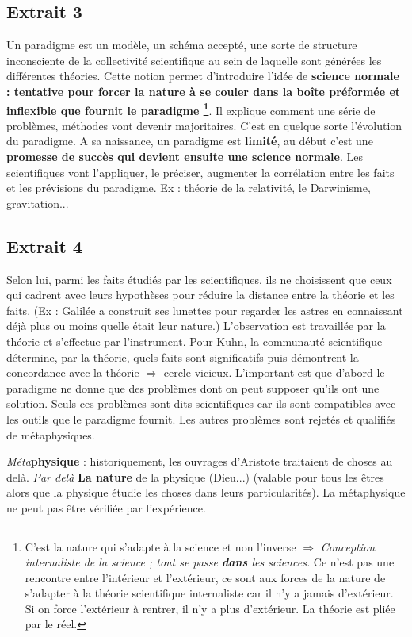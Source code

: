 \subsection{Extrait 3}
Un paradigme est un modèle, un schéma accepté, une sorte de structure inconsciente de la collectivité scientifique au sein de laquelle sont générées les différentes théories.
Cette notion permet d'introduire l'idée de \textbf{science normale : tentative pour forcer la nature à se couler dans la boîte préformée et inflexible que fournit le paradigme
\footnote{C'est la nature qui s'adapte à la science et non l'inverse $\Rightarrow$ \emph{Conception internaliste de la science ; tout se passe \textbf{dans} les sciences.} Ce n'est pas une rencontre entre l'intérieur et l'extérieur, ce sont aux forces de la nature de s'adapter à la théorie scientifique internaliste car il n'y a jamais d'extérieur.
Si on force l'extérieur à rentrer, il n'y a plus d'extérieur.
La théorie est pliée par le réel.}}.
Il explique comment une série de problèmes, méthodes vont devenir majoritaires.
C'est en quelque sorte l'évolution du paradigme.
A sa naissance, un paradigme est \textbf{limité}, au début c'est une \textbf{promesse de succès qui devient ensuite une science normale}.
Les scientifiques vont l'appliquer, le préciser, augmenter la corrélation entre les faits et les prévisions du paradigme.
Ex : théorie de la relativité, le Darwinisme, gravitation...
\subsection{Extrait 4}
Selon lui, parmi les faits étudiés par les scientifiques, ils ne choisissent que ceux qui cadrent avec leurs hypothèses pour réduire la distance entre la théorie et les faits.
(Ex : Galilée a construit ses lunettes pour regarder les astres en connaissant déjà plus ou moins quelle était leur nature.) L'observation est travaillée par la théorie et s'effectue par l'instrument.
Pour Kuhn, la communauté scientifique détermine, par la théorie, quels faits sont significatifs puis démontrent la concordance avec la théorie $\Rightarrow$ cercle vicieux.
L'important est que d'abord le paradigme ne donne que des problèmes dont on peut supposer qu'ils ont une solution.
Seuls ces problèmes  sont dits scientifiques car ils sont compatibles avec les outils que le paradigme fournit.
Les autres problèmes sont rejetés et qualifiés de métaphysiques.

\emph{Méta}\textbf{physique} : historiquement, les ouvrages d'Aristote traitaient de choses au delà.
\emph{Par delà} \textbf{La nature} de la physique (Dieu...) (valable pour tous les êtres alors que la physique étudie les choses dans leurs particularités).
La métaphysique ne peut pas être vérifiée par l'expérience.
